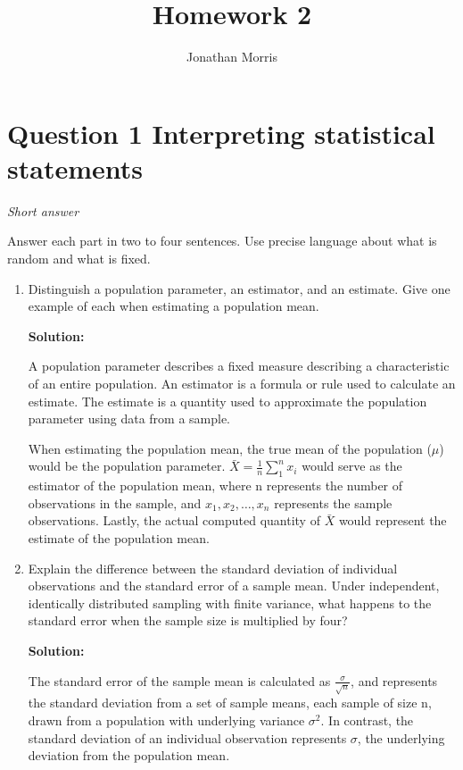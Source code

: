 \documentclass[11pt]{article}
\title{Homework 2}
\author{Jonathan Morris}
\date{}
\newcommand{\solution}{\par\medskip\noindent\textbf{Solution:}\par\vspace{0cm}}
\begin{document}
\maketitle

\section*{Question 1 \quad Interpreting statistical statements}
\textit{Short answer}

Answer each part in two to four sentences. Use precise language about what is random and what is fixed.

\begin{enumerate}[label=\textbf{(\alph*)}]
  \item Distinguish a population parameter, an estimator, and an estimate. Give one example of each when estimating a population mean.
  \solution

  A population parameter describes a fixed measure describing a characteristic of an entire population. 
  An estimator is a formula or rule used to calculate an estimate. 
  The estimate is a quantity used to approximate the population parameter using data from a sample.



  When estimating the population mean, the true mean of the population ($\mu$) would be the population parameter. 
  $\bar{X} = \frac{1}{n} \sum_{1}^{n} x_i$ would serve as the estimator of the population mean, where n represents the number of observations in the sample, and $x_1, x_2, \dots, x_n$ represents the sample observations. 
  Lastly, the actual computed quantity of $\bar{X}$ would represent the estimate of the population mean.
  
  \item Explain the difference between the standard deviation of individual observations and the standard error of a sample mean. Under independent, identically distributed sampling with finite variance, what happens to the standard error when the sample size is multiplied by four?
  \solution

  The standard error of the sample mean is calculated as $\frac{\sigma}{\sqrt{n}}$, and represents the standard deviation from a set of sample means, each sample of size n, drawn from a population with underlying variance $\sigma^2$.
  In contrast, the standard deviation of an individual observation represents $\sigma$, the underlying deviation from the population mean.


\end{enumerate}
\end{document}
